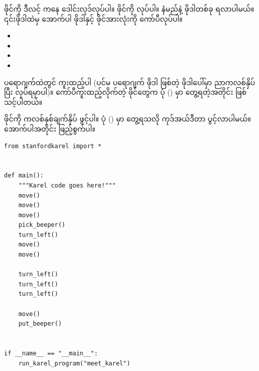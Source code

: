  ဖိုင်ကို  ဒီလင့်  ကနေ ဒေါင်းလုဒ်လုပ်ပါ။  ဖိုင်ကို  လုပ်ပါ။  နံမည်နဲ့ ဖိုဒါတစ်ခု ရလာပါမယ်။ ၎င်းဖိုဒါထဲမှ အောက်ပါ  ဖိုဒါနှင့်  ဖိုင်အားလုံးကို ကော်ပီလုပ်ပါ။ 
%
\begin{itemize}
    \item {} 
    \item {}
    \item {}
    \item {}
\end{itemize}
%
 ပရောဂျက်ထဲတွင် ကူးထည့်ပါ (ပင်မ ပရောဂျက် ဖိုဒါ ဖြစ်တဲ့  ဖိုဒါပေါ်မှာ ညာကလစ်နှိပ်ပြီး  လုပ်ရမှာပါ)။ ကော်ပီကူးထည့်လိုက်တဲ့ ဖိုင်တွေက ပုံ (\fRefNo{\ref{fig:proj_struct}}) မှာ တွေ့ရတဲ့အတိုင်း ဖြစ်သင့်ပါတယ်။

 ဖိုင်ကို ကလစ်နှစ်ချက်နှိပ် ဖွင့်ပါ။ ပုံ (\fRefNo{\ref{fig:edit_meet_karel}}) မှာ တွေ့ရသလို ကုဒ်အယ်ဒီတာ  ပွင့်လာပါမယ်။ အောက်ပါအတိုင်း ဖြည့်စွက်ပါ။
%
\setlength{\fboxsep}{0pt}
\begin{verbatim}
from stanfordkarel import *


def main():
    """Karel code goes here!"""
    move()
    move()
    move()
    pick_beeper()
    turn_left()
    move()
    move()

    turn_left()
    turn_left()
    turn_left()

    move()
    put_beeper()


if __name__ == "__main__":
    run_karel_program("meet_karel")
\end{verbatim}
%



